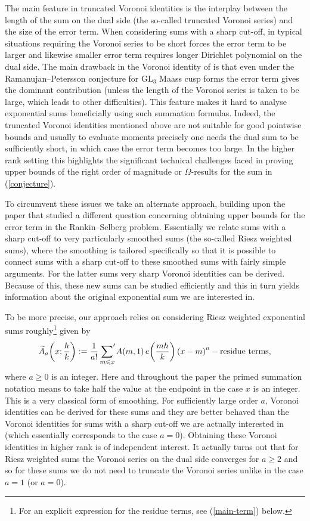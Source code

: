 \documentclass[a4paper,10pt,twoside]{amsart}
\theoremstyle{definition}
\numberwithin{equation}{section}
\renewcommand\:{\colon}
\newcommand{\sump}{\mathop{{\sum}^{\raisebox{-3pt}{\makebox[0pt][l]{$'$}}}}}
\begin{document}
The main feature in truncated Voronoi identities is the interplay between the length of the sum on the dual side (the so-called truncated Voronoi series) and the size of the error term. When considering sums with a sharp cut-off, in typical situations requiring the Voronoi series to be short forces the error term to be larger and likewise smaller error term requires longer Dirichlet polynomial on the dual side. The main drawback in the Voronoi identity of \cite{Jaasaari--Vesalainen1} is that even under the Ramanujan--Petersson conjecture for $\mathrm{GL}_3$ Maass cusp forms the error term gives the dominant contribution (unless the length of the Voronoi series is taken to be large, which leads to other difficulties). This feature makes it hard to analyse exponential sums beneficially using such summation formulas. Indeed, the truncated Voronoi identities mentioned above are not suitable for good pointwise bounds and usually to evaluate moments precisely one needs the dual sum to be sufficiently short, in which case the error term becomes too large. In the higher rank setting this highlights the significant technical challenges faced in proving upper bounds of the right order of magnitude or $\Omega$-results for the sum in (\ref{conjecture}).

To circumvent these issues we take an alternate approach, building upon the paper \cite{Ivic--Matsumoto--Tanigawa} that studied a different question concerning obtaining upper bounds for the error term in the Rankin--Selberg problem. Essentially we relate sums with a sharp cut-off to very particularly smoothed sums (the so-called Riesz weighted sums), where the smoothing is tailored specifically so that it is possible to connect sums with a sharp cut-off to these smoothed sums with fairly simple arguments. For the latter sums very sharp Voronoi identities can be derived. Because of this, these new sums can be studied efficiently and this in turn yields information about the original exponential sum we are interested in.  

To be more precise, our approach relies on considering Riesz weighted exponential sums roughly\footnote{For an explicit expression for the residue terms, see (\ref{main-term}) below.} given by
\begin{align}\label{Riesz-sums}
\widetilde A_a\!\left(x;\frac hk\right):=\frac1{a!}\sump_{m\leqslant x}A(m,1)\,e\!\left(\frac{mh}k\right)\left(x-m\right)^a-\text{residue terms},
\end{align}
where $a\geqslant 0$ is an integer. Here and throughout the paper the primed summation notation means to take half the value at the endpoint in the case $x$ is an integer. This is a very classical form of smoothing. For sufficiently large order $a$, Voronoi identities can be derived for these sums and they are better behaved than the Voronoi identities for sums with a sharp cut-off we are actually interested in (which essentially corresponds to the case $a=0$). Obtaining these Voronoi identities in higher rank is of independent interest. It actually turns out that for Riesz weighted sums the Voronoi series on the dual side converges for $a\geq 2$ and so for these sums we do not need to truncate the Voronoi series unlike in the case $a=1$ (or $a=0$). 
\end{document}

